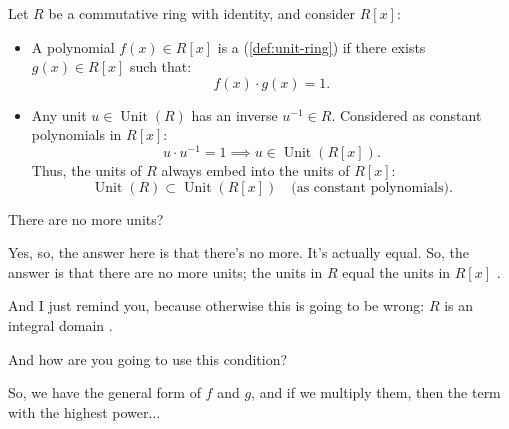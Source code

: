 \begin{content}
Let $R$ be a commutative ring with identity, and consider $R[x]$:
\begin{itemize}
    \item A polynomial $f(x) \in R[x]$ is a  (\cref{def:unit-ring}) if there exists $g(x) \in R[x]$ such that:
    \begin{equation}\label{eq:poly-unit-condition}
    f(x) \cdot g(x) = 1.
    \end{equation}
    \item Any unit $u \in \operatorname{Unit}(R)$ has an inverse $u^{-1} \in R$. Considered as constant polynomials in $R[x]$:
    \[
    u \cdot u^{-1} = 1 \implies u \in \operatorname{Unit}(R[x]).
    \]
    Thus, the units of $R$ always embed into the units of $R[x]$:
    \begin{equation}\label{eq:units-embedding}
    \operatorname{Unit}(R) \subset \operatorname{Unit}(R[x]) \quad \text{(as constant polynomials)}.
    \end{equation}
\end{itemize}
\end{content}

\begin{student}
There are no more units?
\end{student}

\begin{speech}[00:20:12 - 00:20:37]
Yes, so, the answer here is that there's no more. It's actually equal. So, the answer is that there are no more units; the units in $R$ equal the units in $R[x]$ .

And I just remind you, because otherwise this is going to be wrong: $R$ is an integral domain .

And how are you going to use this condition?
\end{speech}

\begin{student}
So, we have the general form of $f$ and $g$, and if we multiply them, then the term with the highest power...
\end{student}

